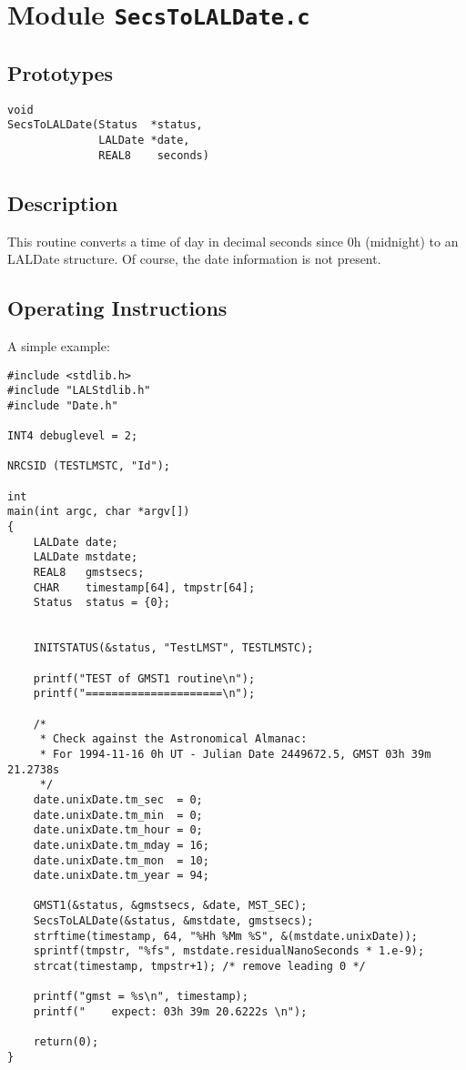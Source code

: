 

\section{Module \texttt{SecsToLALDate.c}}

\subsection{Prototypes}
\begin{verbatim}
void
SecsToLALDate(Status  *status,
              LALDate *date,
              REAL8    seconds)
\end{verbatim}

\subsection{Description}

This routine converts a time of day in decimal seconds since 0h (midnight)
to an LALDate structure.  Of course, the date information is not present.

\subsection{Operating Instructions}

A simple example:

\begin{verbatim}
#include <stdlib.h>
#include "LALStdlib.h"
#include "Date.h"

INT4 debuglevel = 2;

NRCSID (TESTLMSTC, "Id");

int
main(int argc, char *argv[])
{
    LALDate date;
    LALDate mstdate;
    REAL8   gmstsecs;
    CHAR    timestamp[64], tmpstr[64];
    Status  status = {0};

    
    INITSTATUS(&status, "TestLMST", TESTLMSTC);

    printf("TEST of GMST1 routine\n");
    printf("=====================\n");

    /*
     * Check against the Astronomical Almanac:
     * For 1994-11-16 0h UT - Julian Date 2449672.5, GMST 03h 39m 21.2738s
     */
    date.unixDate.tm_sec  = 0;
    date.unixDate.tm_min  = 0;
    date.unixDate.tm_hour = 0;
    date.unixDate.tm_mday = 16;
    date.unixDate.tm_mon  = 10;
    date.unixDate.tm_year = 94;

    GMST1(&status, &gmstsecs, &date, MST_SEC);
    SecsToLALDate(&status, &mstdate, gmstsecs);
    strftime(timestamp, 64, "%Hh %Mm %S", &(mstdate.unixDate));
    sprintf(tmpstr, "%fs", mstdate.residualNanoSeconds * 1.e-9);
    strcat(timestamp, tmpstr+1); /* remove leading 0 */
    
    printf("gmst = %s\n", timestamp);
    printf("    expect: 03h 39m 20.6222s \n");

    return(0);
}

\end{verbatim}

